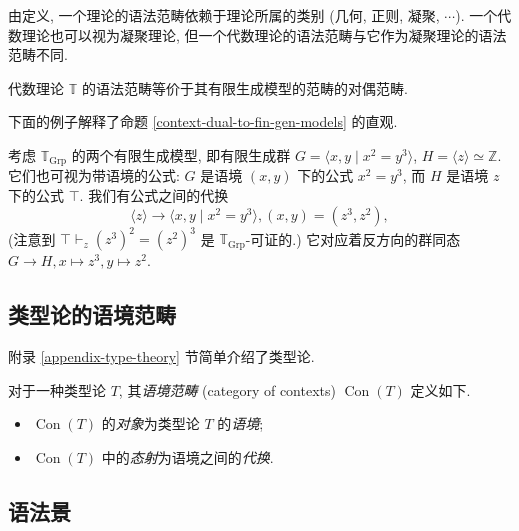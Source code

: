 \begin{remark}
	{}
	由定义, 一个理论的语法范畴依赖于理论所属的类别 (几何, 正则, 凝聚, $\cdots$). 一个代数理论也可以视为凝聚理论, 但一个代数理论的语法范畴与它作为凝聚理论的语法范畴不同.
\end{remark}

\begin{prop}
	[label={context-dual-to-fin-gen-models}]
	{}
	代数理论 $\mathbb T$ 的语法范畴等价于其有限生成模型的范畴的对偶范畴.
\end{prop}

下面的例子解释了命题 \ref{context-dual-to-fin-gen-models} 的直观.

\begin{example}
	{}
	考虑 $\mathbb T_{\text{Grp}}$ 的两个有限生成模型, 即有限生成群 $G = \langle x,y\mid x^2=y^3 \rangle$, $H = \langle z \rangle \simeq \mathbb{Z}$. 它们也可视为带语境的公式: $G$ 是语境 $(x,y)$ 下的公式 $x^2=y^3$, 而 $H$ 是语境 $z$ 下的公式 $\top$.
	我们有公式之间的代换 $$\langle z \rangle \to \langle x,y\mid x^2=y^3 \rangle, (x,y)=(z^3,z^2),$$
	(注意到 $\top\vdash_{z} (z^3)^2=(z^2)^3$ 是 $\mathbb T_{\text{Grp}}$-可证的.) 它对应着反方向的群同态 $G\to H, x\mapsto z^3, y\mapsto z^2$.
\end{example}

\subsection{类型论的语境范畴}

附录 \ref{appendix-type-theory} 节简单介绍了类型论.

\begin{definition}
	{}
	对于一种类型论 $T$, 其\emph{语境范畴} (category of contexts) $\operatorname{Con}(T)$ 定义如下.
	\begin{itemize}
		\item $\operatorname{Con}(T)$ 的\emph{对象}为类型论 $T$ 的\emph{语境};
		\item $\operatorname{Con}(T)$ 中的\emph{态射}为语境之间的\emph{代换}.
	\end{itemize}
\end{definition}

\subsection{语法景}

